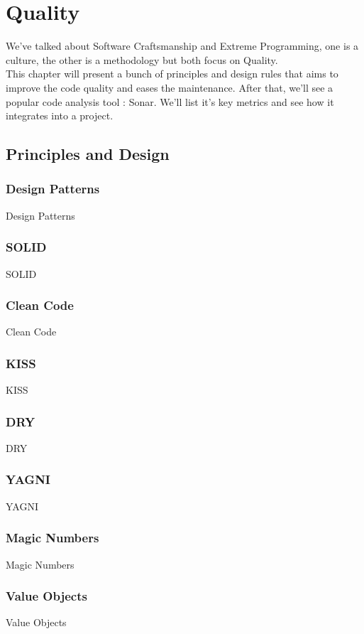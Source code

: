\section{Quality}\label{sec:quality}
We've talked about Software Craftsmanship and Extreme Programming,
one is a culture, the other is a methodology but both focus on Quality. \\
This chapter will present a bunch of principles and design rules that
aims to improve the code quality and eases the maintenance.
After that, we'll see a popular code analysis tool : Sonar.
We'll list it's key metrics and see how it integrates into a project.

\subsection{Principles and Design}\label{subsec:principles}

\subsubsection{Design Patterns}
Design Patterns

\subsubsection{SOLID}
SOLID

\subsubsection{Clean Code}
Clean Code

\subsubsection{KISS}
KISS

\subsubsection{DRY}
DRY

\subsubsection{YAGNI}
YAGNI

\subsubsection{Magic Numbers}
Magic Numbers

\subsubsection{Value Objects}
Value Objects

